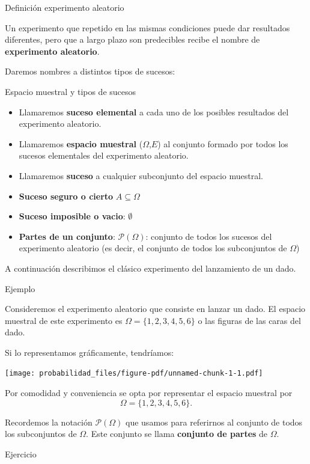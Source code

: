 \documentclass[
  letterpaper,
  DIV=11,
  numbers=noendperiod]{scrreprt}
\providecommand{\tightlist}{%
  \setlength{\itemsep}{0pt}\setlength{\parskip}{0pt}}\usepackage{longtable,booktabs,array}
\begin{document}
Definición experimento aleatorio

Un experimento que repetido en las mismas condiciones puede dar
resultados diferentes, pero que a largo plazo son predecibles recibe el
nombre de \textbf{experimento aleatorio}.

Daremos nombres a distintos tipos de sucesos:

Espacio muestral y tipos de sucesos

\begin{itemize}
\tightlist
\item
  Llamaremos \textbf{suceso elemental} a cada uno de los posibles
  resultados del experimento aleatorio.
\item
  Llamaremos \textbf{espacio muestral} (\(\Omega\),\(E\)) al conjunto
  formado por todos los sucesos elementales del experimento aleatorio.
\item
  Llamaremos \textbf{suceso} a cualquier subconjunto del espacio
  muestral.
\item
  \textbf{Suceso seguro o cierto} \(A\subseteq \Omega\)
\item
  \textbf{Suceso imposible o vacio}: \(\emptyset\)
\item
  \textbf{Partes de un conjunto}: \(\mathcal{P}(\Omega)\): conjunto de
  todos los sucesos del experimento aleatorio (es decir, el conjunto de
  todos los subconjuntos de \(\Omega\))
\end{itemize}

A continuación describimos el clásico experimento del lanzamiento de un
dado.

Ejemplo

Consideremos el experimento aleatorio que consiste en lanzar un dado. El
espacio muestral de este experimento es \(\Omega=\{1,2,3,4,5,6\}\) o las
figuras de las caras del dado.

Si lo representamos gráficamente, tendríamos:

\begin{center}
\texttt{[image: probabilidad\_files/figure-pdf/unnamed-chunk-1-1.pdf]}
\end{center}

Por comodidad y conveniencia se opta por representar el espacio muestral
por \[\Omega = \{1,2,3,4,5,6\}.\]

Recordemos la notación \(\mathcal{P}(\Omega)\) que usamos para
referirnos al conjunto de todos los subconjuntos de \(\Omega\). Este
conjunto se llama \textbf{conjunto de partes} de \(\Omega\).

Ejercicio
\end{document}
